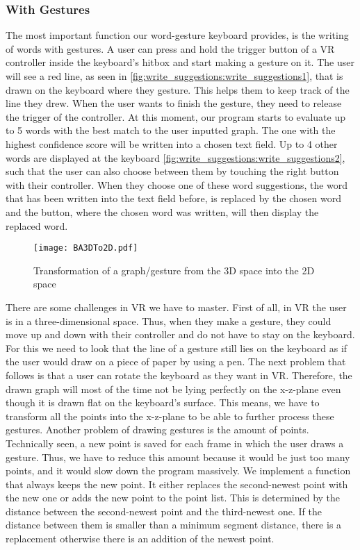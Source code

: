 \subsubsection{With Gestures}
The most important function our word-gesture keyboard provides, is the writing of words with gestures. A user can press and hold the trigger button of a VR controller inside the keyboard's hitbox and start making a gesture on it. The user will see a red line, as seen in \cref{fig:write_suggestions:write_suggestions1}, that is drawn on the keyboard where they gesture. This helps them to keep track of the line they drew. When the user wants to finish the gesture, they need to release the trigger of the controller. At this moment, our program starts to evaluate up to 5 words with the best match to the user inputted graph. The one with the highest confidence score will be written into a chosen text field. Up to 4 other words are displayed at the keyboard \cref{fig:write_suggestions:write_suggestions2}, such that the user can also choose between them by touching the right button with their controller. When they choose one of these word suggestions, the word that has been written into the text field before, is replaced by the chosen word and the button, where the chosen word was written, will then display the replaced word.\\
\begin{figure}[H]
    \centering
    \texttt{[image: BA3DTo2D.pdf]}
    \caption{Transformation of a graph/gesture from the 3D space into the 2D space}
    \label{fig:3DTo2D}
    \end{figure}
There are some challenges in VR we have to master. First of all, in VR the user is in a three-dimensional space. Thus, when they make a gesture, they could move up and down with their controller and do not have to stay on the keyboard. For this we need to look that the line of a gesture still lies on the keyboard as if the user would draw on a piece of paper by using a pen. The next problem that follows is that a user can rotate the keyboard as they want in VR. Therefore, the drawn graph will most of the time not be lying perfectly on the x-z-plane even though it is drawn flat on the keyboard's surface. This means, we have to transform all the points into the x-z-plane to be able to further process these gestures. Another problem of drawing gestures is the amount of points. Technically seen, a new point is saved for each frame in which the user draws a gesture. Thus, we have to reduce this amount because it would be just too many points, and it would slow down the program massively. We implement a function that always keeps the new point. It either replaces the second-newest point with the new one or adds the new point to the point list. This is determined by the distance between the second-newest point and the third-newest one. If the distance between them is smaller than a minimum segment distance, there is a replacement otherwise there is an addition of the newest point.

